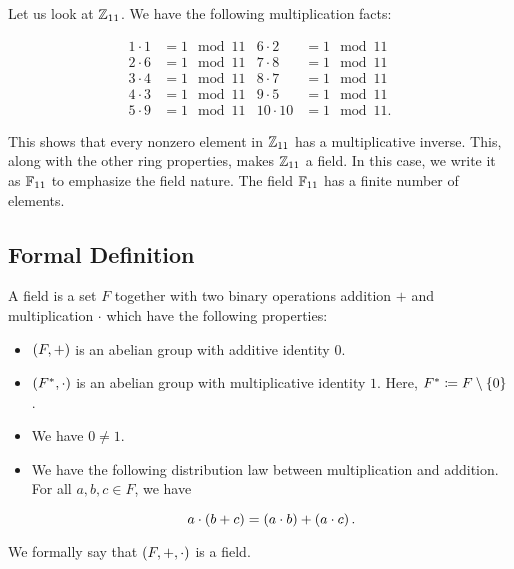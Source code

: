 \begin{example}

Let us look at $\mathbb{Z}_{11}$.
We have the following multiplication facts:

\begin{align}
    1\cdot 1 &= 1 \mod 11
        &
    6\cdot 2 &= 1 \mod 11 \nonumber\\
    2\cdot 6 &= 1 \mod 11
        &
    7\cdot 8 &= 1 \mod 11 \nonumber\\
    3\cdot 4 &= 1 \mod 11
        &
    8\cdot 7 &= 1 \mod 11 \nonumber\\
    4\cdot 3 &= 1 \mod 11
        &
    9\cdot 5 &= 1 \mod 11 \nonumber\\
    5\cdot 9 &= 1 \mod 11
        &
    10\cdot 10 &= 1 \mod 11.
\end{align}

\noindent
This shows that every nonzero element in $\mathbb{Z}_{11}$ has a multiplicative
inverse.
This, along with the other \gls{ring} properties, makes $\mathbb{Z}_{11}$ a \gls{field}.
In this case, we write it as $\mathbb{F}_{11}$ to emphasize the \gls{field} nature.
The \gls{field} $\mathbb{F}_{11}$ has a finite number of elements.
\end{example}

\subsection{Formal Definition}
\begin{defn}[Field]
A \gls{field} is a \gls{set} $F$ together with two binary operations
addition $+$ and multiplication $\cdot$ which have the following properties:

\begin{itemize}
\item $\left( F,+ \right)$ is an \gls{abelian group} with additive identity $0$.

\item $\left( F^{*},\cdot \right)$ is an \gls{abelian group} with multiplicative
    identity $1$.
    Here, $F^{*} \coloneqq{} F\setminus\left\{ 0 \right\}$.

\item We have $0\ne 1$.

\item We have the following distribution law between multiplication
    and addition.
    For all $a,b,c\in F$, we have

\begin{equation}
    a\cdot\left( b + c \right) = \left( a\cdot b \right) + \left( a\cdot c \right).
\end{equation}
\end{itemize}

\noindent
We formally say that $\left( F,+,\cdot \right)$ is a \gls{field}.
\end{defn}

